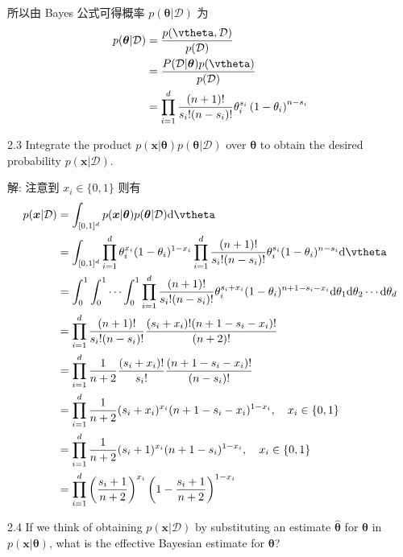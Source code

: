 \documentclass[openany]{ctexbook}
\theoremstyle{kaiti}
\theoremstyle{normal}
\begin{document}
所以由 Bayes 公式可得概率 $p(\bm{\theta}|\mathcal{D})$ 为
\begin{equation}
  \begin{aligned}
    p(\bm{\theta}|\mathcal{D})
    &=\frac{p(\vtheta,\mathcal{D})}{p(\mathcal{D})}\\
    &=\frac{P(\mathcal{D}|\bm{\theta})p(\vtheta)}{p(\mathcal{D})}\\
    &=\prod_{i=1}^d\frac{(n+1)!}{s_i!(n-s_i)!}\theta_{i}^{s_{i}}\left(1-\theta_{i}\right)^{n-s_{i}}\\
  \end{aligned}
\end{equation}

2.3 Integrate the product $p(\bm{x}|\bm{\theta}) p(\bm{\theta}|\mathcal{D})$ over $\bm{\theta}$ to obtain the desired probability $p(\bm{x}|\mathcal{D})$.

解: 注意到 $x_i\in\{0,1\}$ 则有
\begin{equation}
  \begin{aligned}
    p(\bm{x}|\mathcal{D})
    &=\int_{[0,1]^d} p(\bm{x}|\bm{\theta}) p(\bm{\theta}|\mathcal{D})\mathrm{d}\vtheta\\
    &=\int_{[0,1]^d} \prod_{i=1}^{d} \theta_{i}^{x_{i}}(1-\theta_{i})^{1-x_{i}} \prod_{i=1}^d\frac{(n+1)!}{s_i!(n-s_i)!}\theta_{i}^{s_{i}}(1-\theta_{i})^{n-s_{i}}\mathrm{d}\vtheta\\
    &=\int_0^1\int_0^1\cdots\int_0^1 \prod_{i=1}^{d}\frac{(n+1)!}{s_i!(n-s_i)!}\theta_{i}^{s_{i}+x_{i}}(1-\theta_{i})^{n+1-s_{i}-x_i}\mathrm{d}\theta_1\mathrm{d}\theta_2\cdots\mathrm{d}\theta_d\\
    &=\prod_{i=1}^{d}\frac{(n+1)!}{s_i!(n-s_i)!}\frac{(s_i+x_i)!(n+1-s_i-x_i)!}{(n+2)!}\\
    &=\prod_{i=1}^{d}\frac{1}{n+2}\frac{(s_i+x_i)!}{s_i!}\frac{(n+1-s_i-x_i)!}{(n-s_i)!}\\
    &=\prod_{i=1}^{d}\frac{1}{n+2}(s_i+x_i)^{x_i}(n+1-s_i-x_i)^{1-x_i},\quad x_i\in\{0,1\}\\
    &=\prod_{i=1}^{d}\frac{1}{n+2}(s_i+1)^{x_i}(n+1-s_i)^{1-x_i},\quad x_i\in\{0,1\}\\
    &=\prod_{i=1}^{d}\left(\frac{s_i+1}{n+2}\right)^{x_i}\left(1-\frac{s_i+1}{n+2}\right)^{1-x_i}\\
  \end{aligned}
\end{equation}

2.4 If we think of obtaining $p(\bm{x}|\mathcal{D})$ by substituting an estimate $\hat{\bm{\theta}}$ for $\bm{\theta}$ in $p(\bm{x}|\bm{\theta})$,
what is the effective Bayesian estimate for $\bm{\theta}$?
\end{document}
